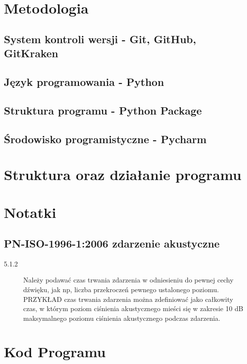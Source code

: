 \documentclass[eng,printmode]{mgr}
\begin{document}
\chapter{Metodologia}
\section{System kontroli wersji - Git, GitHub, GitKraken}
\section{Język programowania - Python}
\section{Struktura programu - Python Package}
\section{Środowisko programistyczne - Pycharm}
\chapter{Struktura oraz działanie programu}

\chapter{Notatki}
\section{PN-ISO-1996-1:2006 zdarzenie akustyczne}
\begin{description}
\item[5.1.2] Należy podawać czas trwania zdarzenia w odniesieniu do pewnej cechy dźwięku, jak np, liczba przekroczeń pewnego ustalonego poziomu. 
PRZYKŁAD czas trwania zdarzenia można zdefiniować jako całkowity czas, w którym poziom ciśnienia akustycznego mieści się w zakresie 10 dB maksymalnego poziomu ciśnienia akustycznego podczas zdarzenia. 
\end{description}
\appendix
\chapter{Kod Programu}


\end{document}
